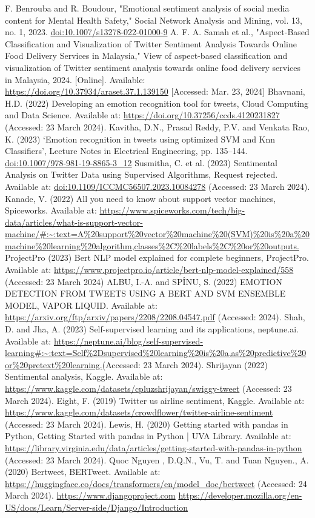 \documentclass[conference]{IEEEtran}
\begin{document}
\begin{thebibliography}{00}
 F. Benrouba and R. Boudour, "Emotional sentiment analysis of social media content for Mental Health Safety," Social Network Analysis and Mining, vol. 13, no. 1, 2023. \url{doi:10.1007/s13278-022-01000-9}
 A. F. A. Samah et al., "Aspect-Based Classification and Visualization of Twitter Sentiment Analysis Towards Online Food Delivery Services in Malaysia," View of aspect-based classification and visualization of Twitter sentiment analysis towards online food delivery services in Malaysia, 2024. [Online]. Available: \url{https://doi.org/10.37934/araset.37.1.139150} [Accessed: Mar. 23, 2024]
 Bhavnani, H.D. (2022) Developing an emotion recognition tool for tweets, Cloud Computing and Data Science. Available at: \url{https://doi.org/10.37256/ccds.4120231827} (Accessed: 23 March 2024). 
 Kavitha, D.N., Prasad Reddy, P.V. and Venkata Rao, K. (2023) ‘Emotion recognition in tweets using optimized SVM and Knn Classifiers’, Lecture Notes in Electrical Engineering, pp. 135–144. \url{doi:10.1007/978-981-19-8865-3_12}
Susmitha, C. et al. (2023) Sentimental Analysis on Twitter Data using Supervised Algorithms, Request rejected. Available at: \url{doi:10.1109/ICCMC56507.2023.10084278} (Accessed: 23 March 2024).
 Kanade, V. (2022) All you need to know about support vector machines, Spiceworks. Available at: \url{https://www.spiceworks.com/tech/big-data/articles/what-is-support-vector-machine/#:~:text=A%20support%20vector%20machine%20(SVM)%20is%20a%20machine%20learning%20algorithm,classes%2C%20labels%2C%20or%20outputs.}
 ProjectPro (2023) Bert NLP model explained for complete beginners, ProjectPro. Available at: \url{https://www.projectpro.io/article/bert-nlp-model-explained/558} (Accessed: 23 March 2024)
 ALBU, I.-A. and SPÎNU, S. (2022) EMOTION DETECTION FROM TWEETS USING A BERT AND SVM ENSEMBLE MODEL, VAPOR LIQUID. Available at: \url{https://arxiv.org/ftp/arxiv/papers/2208/2208.04547.pdf} (Accessed: 2024). 
 Shah, D. and Jha, A. (2023) Self-supervised learning and its applications, neptune.ai. Available at: \url{https://neptune.ai/blog/self-supervised-learning#:~:text=Self%2Dsupervised%20learning%20is%20a,as%20predictive%20or%20pretext%20learning.}(Accessed: 23 March 2024). 
 Shrijayan (2022) Sentimental analysis, Kaggle. Available at: \url{ https://www.kaggle.com/datasets/cpluzshrijayan/swiggy-tweet} (Accessed: 23 March 2024).  
 Eight, F. (2019) Twitter us airline sentiment, Kaggle. Available at: \url{https://www.kaggle.com/datasets/crowdflower/twitter-airline-sentiment} (Accessed: 23 March 2024). 
 Lewis, H. (2020) Getting started with pandas in Python, Getting Started with pandas in Python | UVA Library. Available at: \url{https://library.virginia.edu/data/articles/getting-started-with-pandas-in-python} (Accessed: 23 March 2024). 
 Quoc Nguyen , D.Q.N.,  Vu, T. and Tuan Nguyen., A. (2020) Bertweet, BERTweet. Available at: \url{https://huggingface.co/docs/transformers/en/model_doc/bertweet} (Accessed: 24 March 2024). 
 \url{https://www.djangoproject.com}
 \url{https://developer.mozilla.org/en-US/docs/Learn/Server-side/Django/Introduction}
\end{thebibliography}
\vspace{12pt}
\end{document}
